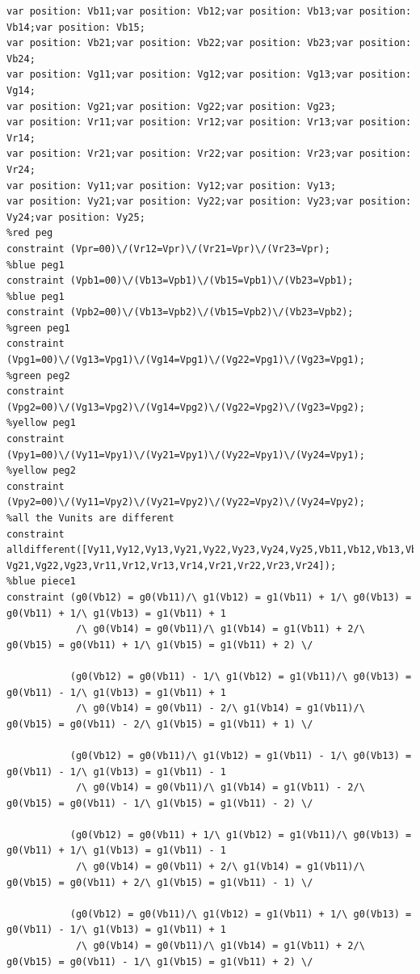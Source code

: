\begin{appendices}
\begin{lstlisting}[language=minizinc]
var position: Vb11;var position: Vb12;var position: Vb13;var position: Vb14;var position: Vb15;
var position: Vb21;var position: Vb22;var position: Vb23;var position: Vb24;
var position: Vg11;var position: Vg12;var position: Vg13;var position: Vg14;
var position: Vg21;var position: Vg22;var position: Vg23;
var position: Vr11;var position: Vr12;var position: Vr13;var position: Vr14; 
var position: Vr21;var position: Vr22;var position: Vr23;var position: Vr24;
var position: Vy11;var position: Vy12;var position: Vy13;
var position: Vy21;var position: Vy22;var position: Vy23;var position: Vy24;var position: Vy25;
%red peg
constraint (Vpr=00)\/(Vr12=Vpr)\/(Vr21=Vpr)\/(Vr23=Vpr);
%blue peg1
constraint (Vpb1=00)\/(Vb13=Vpb1)\/(Vb15=Vpb1)\/(Vb23=Vpb1);
%blue peg1
constraint (Vpb2=00)\/(Vb13=Vpb2)\/(Vb15=Vpb2)\/(Vb23=Vpb2);
%green peg1
constraint (Vpg1=00)\/(Vg13=Vpg1)\/(Vg14=Vpg1)\/(Vg22=Vpg1)\/(Vg23=Vpg1);
%green peg2
constraint (Vpg2=00)\/(Vg13=Vpg2)\/(Vg14=Vpg2)\/(Vg22=Vpg2)\/(Vg23=Vpg2);
%yellow peg1
constraint (Vpy1=00)\/(Vy11=Vpy1)\/(Vy21=Vpy1)\/(Vy22=Vpy1)\/(Vy24=Vpy1);
%yellow peg2
constraint (Vpy2=00)\/(Vy11=Vpy2)\/(Vy21=Vpy2)\/(Vy22=Vpy2)\/(Vy24=Vpy2);
%all the Vunits are different
constraint alldifferent([Vy11,Vy12,Vy13,Vy21,Vy22,Vy23,Vy24,Vy25,Vb11,Vb12,Vb13,Vb14,Vb15,Vb21,Vb22,Vb23,Vb24,Vg11,Vg12,Vg13,Vg14,
Vg21,Vg22,Vg23,Vr11,Vr12,Vr13,Vr14,Vr21,Vr22,Vr23,Vr24]);
%blue piece1
constraint (g0(Vb12) = g0(Vb11)/\ g1(Vb12) = g1(Vb11) + 1/\ g0(Vb13) = g0(Vb11) + 1/\ g1(Vb13) = g1(Vb11) + 1
            /\ g0(Vb14) = g0(Vb11)/\ g1(Vb14) = g1(Vb11) + 2/\ g0(Vb15) = g0(Vb11) + 1/\ g1(Vb15) = g1(Vb11) + 2) \/
            
           (g0(Vb12) = g0(Vb11) - 1/\ g1(Vb12) = g1(Vb11)/\ g0(Vb13) = g0(Vb11) - 1/\ g1(Vb13) = g1(Vb11) + 1
            /\ g0(Vb14) = g0(Vb11) - 2/\ g1(Vb14) = g1(Vb11)/\ g0(Vb15) = g0(Vb11) - 2/\ g1(Vb15) = g1(Vb11) + 1) \/
            
           (g0(Vb12) = g0(Vb11)/\ g1(Vb12) = g1(Vb11) - 1/\ g0(Vb13) = g0(Vb11) - 1/\ g1(Vb13) = g1(Vb11) - 1
            /\ g0(Vb14) = g0(Vb11)/\ g1(Vb14) = g1(Vb11) - 2/\ g0(Vb15) = g0(Vb11) - 1/\ g1(Vb15) = g1(Vb11) - 2) \/
            
           (g0(Vb12) = g0(Vb11) + 1/\ g1(Vb12) = g1(Vb11)/\ g0(Vb13) = g0(Vb11) + 1/\ g1(Vb13) = g1(Vb11) - 1
            /\ g0(Vb14) = g0(Vb11) + 2/\ g1(Vb14) = g1(Vb11)/\ g0(Vb15) = g0(Vb11) + 2/\ g1(Vb15) = g1(Vb11) - 1) \/
            
           (g0(Vb12) = g0(Vb11)/\ g1(Vb12) = g1(Vb11) + 1/\ g0(Vb13) = g0(Vb11) - 1/\ g1(Vb13) = g1(Vb11) + 1
            /\ g0(Vb14) = g0(Vb11)/\ g1(Vb14) = g1(Vb11) + 2/\ g0(Vb15) = g0(Vb11) - 1/\ g1(Vb15) = g1(Vb11) + 2) \/
            

\end{lstlisting}
\end{appendices}
